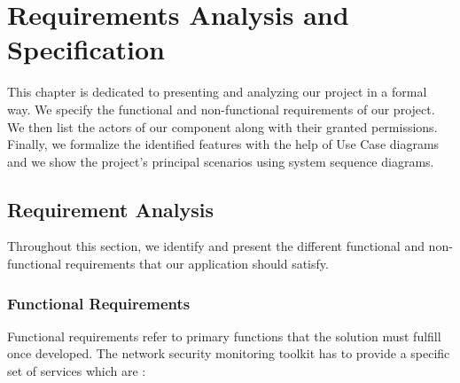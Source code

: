 
\chapter{Requirements Analysis and Specification}
\renewcommand{\chaptername}{Chapter}

This chapter is dedicated to presenting and analyzing our project in a formal way. We specify the functional and non-functional requirements of our project. We then list the actors of our component along with their granted permissions. Finally, we formalize the identified features with the help of Use Case diagrams and we show the project's principal scenarios using system sequence diagrams.

\section{Requirement Analysis}

Throughout this section, we identify and present the different functional and non-functional requirements that our application should satisfy. 

\subsection{Functional Requirements}

Functional requirements refer to primary functions that the solution must fulfill once developed. The network security monitoring toolkit has to provide a specific set of services which are : 

